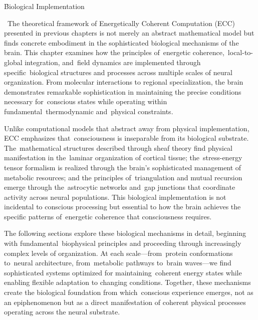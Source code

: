 \h{Biological Implementation}

\begin{refsection}

  ~The theoretical framework of Energetically Coherent Computation (ECC) presented in previous chapters is not merely an abstract mathematical model but finds concrete embodiment in the sophisticated biological mechanisms of the brain. This chapter examines how the principles of~energetic coherence,~local-to-global integration, and~field dynamics are implemented through specific~biological structures and processes across multiple scales of neural organization. From molecular interactions to regional specialization, the brain demonstrates remarkable sophistication in maintaining the precise conditions necessary for~conscious states while operating within fundamental~thermodynamic and~physical constraints.

  Unlike computational models that abstract away from physical implementation, ECC emphasizes that~consciousness is inseparable from its biological substrate. The~mathematical structures described through sheaf theory find physical manifestation in the~laminar organization of cortical tissue; the~stress-energy tensor formalism is realized through the brain's sophisticated management of metabolic resources; and the principles of~triangulation and mutual recursion emerge through the~astrocytic networks and~gap junctions that coordinate activity across neural populations. This biological implementation is not incidental to conscious processing but essential to how the brain achieves the specific patterns of~energetic coherence that consciousness requires.

  The following sections explore these biological mechanisms in detail, beginning with fundamental~biophysical principles and proceeding through increasingly complex levels of organization. At each scale—from~protein conformations to~neural architecture, from~metabolic pathways to~brain waves—we find sophisticated systems optimized for maintaining~coherent energy states while enabling flexible adaptation to changing conditions. Together, these mechanisms create the biological foundation from which~conscious experience emerges, not as an epiphenomenon but as a direct manifestation of coherent physical processes operating across the neural substrate.


\end{refsection}
